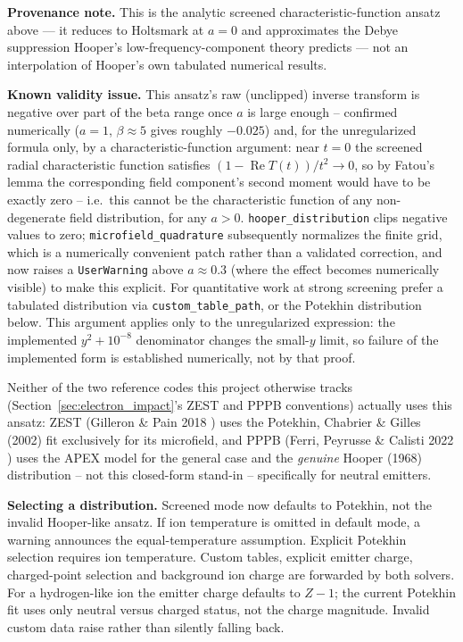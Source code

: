 \documentclass[11pt,a4paper]{article}
\numberwithin{equation}{section}
\begin{document}
\textbf{Provenance note.}  This is the analytic screened characteristic-function ansatz above — it reduces to Holtsmark at $a=0$ and approximates the Debye suppression Hooper's low-frequency-component theory predicts — not an interpolation of Hooper's own tabulated numerical results.

\textbf{Known validity issue.}  This ansatz's raw (unclipped) inverse transform is negative over part of the beta range once $a$ is large enough -- confirmed numerically ($a=1$, $\beta\approx5$ gives roughly $-0.025$) and, for the unregularized formula only, by a characteristic-function argument: near $t=0$ the screened radial characteristic function satisfies $(1-\operatorname{Re}T(t))/t^2 \to 0$, so by Fatou's lemma the corresponding field component's second moment would have to be exactly zero -- i.e.\ this cannot be the characteristic function of any non-degenerate field distribution, for any $a>0$.  \texttt{hooper\_distribution} clips negative values to zero; \texttt{microfield\_quadrature} subsequently normalizes the finite grid, which is a numerically convenient patch rather than a validated correction, and now raises a \texttt{UserWarning} above $a\approx0.3$ (where the effect becomes numerically visible) to make this explicit.  For quantitative work at strong screening prefer a tabulated distribution via \texttt{custom\_table\_path}, or the Potekhin distribution below. This argument applies only to the unregularized expression: the implemented $y^2+10^{-8}$ denominator changes the small-$y$ limit, so failure of the implemented form is established numerically, not by that proof.

Neither of the two reference codes this project otherwise tracks (Section~\ref{sec:electron_impact}'s ZEST and PPPB conventions) actually uses this ansatz: ZEST (Gilleron \& Pain 2018 \cite{Gilleron2018}) uses the Potekhin, Chabrier \& Gilles (2002) fit \cite{potekhin} exclusively for its microfield, and PPPB (Ferri, Peyrusse \& Calisti 2022 \cite{ferri}) uses the APEX model \cite{iglesias1985,iglesias2000} for the general case and the \emph{genuine} Hooper (1968) distribution \cite{hooper} -- not this closed-form stand-in -- specifically for neutral emitters.

\textbf{Selecting a distribution.} Screened mode now defaults to Potekhin, not the invalid Hooper-like ansatz. If ion temperature is omitted in default mode, a warning announces the equal-temperature assumption. Explicit Potekhin selection requires ion temperature. Custom tables, explicit emitter charge, charged-point selection and background ion charge are forwarded by both solvers. For a hydrogen-like ion the emitter charge defaults to $Z-1$; the current Potekhin fit uses only neutral versus charged status, not the charge magnitude. Invalid custom data raise rather than silently falling back.
\end{document}

